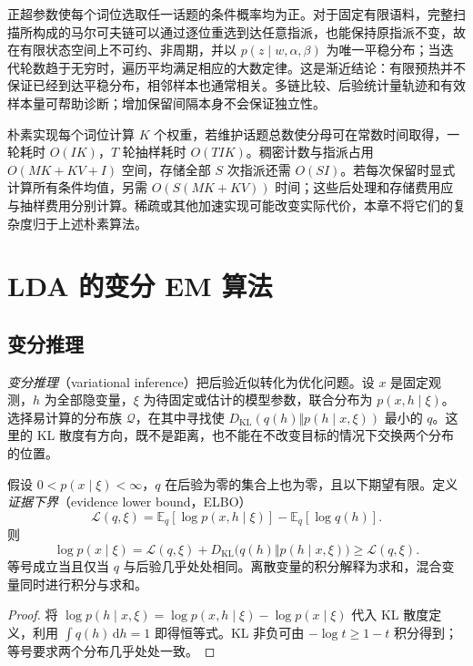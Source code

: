 正超参数使每个词位选取任一话题的条件概率均为正。对于固定有限语料，完整扫描所构成的马尔可夫链可以通过逐位重选到达任意指派，也能保持原指派不变，故在有限状态空间上不可约、非周期，并以 $p(z\mid w,\alpha,\beta)$ 为唯一平稳分布；当迭代轮数趋于无穷时，遍历平均满足相应的大数定律。这是渐近结论：有限预热并不保证已经到达平稳分布，相邻样本也通常相关。多链比较、后验统计量轨迹和有效样本量可帮助诊断；增加保留间隔本身不会保证独立性。

朴素实现每个词位计算 $K$ 个权重，若维护话题总数使分母可在常数时间取得，一轮耗时 $O(IK)$，$T$ 轮抽样耗时 $O(TIK)$。稠密计数与指派占用 $O(MK+KV+I)$ 空间，存储全部 $S$ 次指派还需 $O(SI)$。若每次保留时显式计算所有条件均值，另需 $O(S(MK+KV))$ 时间；这些后处理和存储费用应与抽样费用分别计算。稀疏或其他加速实现可能改变实际代价，本章不将它们的复杂度归于上述朴素算法。

\section{LDA 的变分 EM 算法}
\label{sec:lh-lda-variational-em}

\subsection{变分推理}
\label{subsec:lh-lda-variational-inference}

\emph{变分推理}（variational inference）把后验近似转化为优化问题。设 $x$ 是固定观测，$h$ 为全部隐变量，$\xi$ 为待固定或估计的模型参数，联合分布为 $p(x,h\mid\xi)$。选择易计算的分布族 $\mathcal Q$，在其中寻找使 $D_{\mathrm{KL}}(q(h)\Vert p(h\mid x,\xi))$ 最小的 $q$。这里的 KL 散度有方向，既不是距离，也不能在不改变目标的情况下交换两个分布的位置。

\begin{proposition}[证据下界恒等式]
\label{prop:lh-lda-elbo-identity}
假设 $0<p(x\mid\xi)<\infty$，$q$ 在后验为零的集合上也为零，且以下期望有限。定义\emph{证据下界}（evidence lower bound，ELBO）
\begin{equation}
\mathcal L(q,\xi)=\mathbb E_q[\log p(x,h\mid\xi)]-\mathbb E_q[\log q(h)].
\label{eq:lh-lda-elbo-definition}
\end{equation}
则
\begin{equation}
\log p(x\mid\xi)=\mathcal L(q,\xi)
+D_{\mathrm{KL}}\bigl(q(h)\Vert p(h\mid x,\xi)\bigr)
\geq\mathcal L(q,\xi).
\label{eq:lh-lda-elbo-identity}
\end{equation}
等号成立当且仅当 $q$ 与后验几乎处处相同。离散变量的积分解释为求和，混合变量同时进行积分与求和。
\end{proposition}
\begin{proof}
将 $\log p(h\mid x,\xi)=\log p(x,h\mid\xi)-\log p(x\mid\xi)$ 代入 KL 散度定义，利用 $\int q(h)\,\mathrm dh=1$ 即得恒等式。KL 非负可由 $-\log t\geq1-t$ 积分得到；等号要求两个分布几乎处处一致。
\end{proof}

